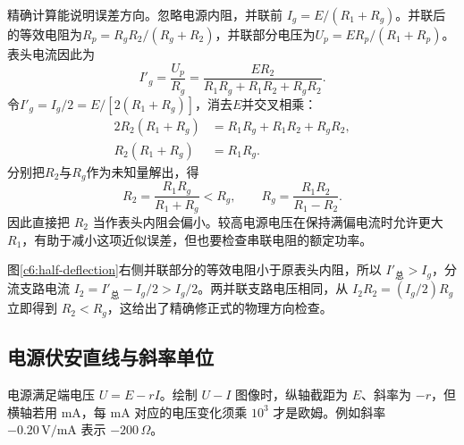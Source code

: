 精确计算能说明误差方向。忽略电源内阻，并联前 $I_g=E/(R_1+R_g)$。并联后的等效电阻为$R_p=R_gR_2/(R_g+R_2)$，并联部分电压为$U_p=ER_p/(R_1+R_p)$。表头电流因此为
\[
I'_g=\frac{U_p}{R_g}
=\frac{ER_2}{R_1R_g+R_1R_2+R_gR_2}.
\]
令$I'_g=I_g/2=E/[2(R_1+R_g)]$，消去$E$并交叉相乘：
\begin{align*}
2R_2(R_1+R_g)&=R_1R_g+R_1R_2+R_gR_2,\\
R_2(R_1+R_g)&=R_1R_g.
\end{align*}
分别把$R_2$与$R_g$作为未知量解出，得
\[
 R_2=\frac{R_1R_g}{R_1+R_g}<R_g,\qquad
 R_g=\frac{R_1R_2}{R_1-R_2}.
\]
因此直接把 $R_2$ 当作表头内阻会偏小。较高电源电压在保持满偏电流时允许更大 $R_1$，有助于减小这项近似误差，但也要检查串联电阻的额定功率。

图\ref{c6:half-deflection}右侧并联部分的等效电阻小于原表头内阻，所以 $I'_{\text{总}}>I_g$，分流支路电流 $I_2=I'_{\text{总}}-I_g/2>I_g/2$。两并联支路电压相同，从 $I_2R_2=(I_g/2)R_g$ 立即得到 $R_2<R_g$，这给出了精确修正式的物理方向检查。

\subsection{电源伏安直线与斜率单位}

电源满足端电压 $U=E-rI$。绘制 $U-I$ 图像时，纵轴截距为 $E$、斜率为 $-r$，但横轴若用 $\mathrm{mA}$，每 $\mathrm{mA}$ 对应的电压变化须乘 $10^3$ 才是欧姆。例如斜率 $-0.20\,\mathrm{V/mA}$ 表示 $-200\,\Omega$。

